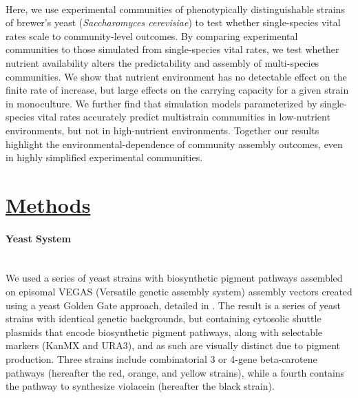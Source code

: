 \paragraph*{}
Here, we use experimental communities of phenotypically distinguishable strains of brewer's yeast (\textit{Saccharomyces cerevisiae}) to test whether single-species vital rates scale to community-level outcomes. By comparing experimental communities to those simulated from single-species vital rates, we test whether nutrient availability alters the predictability and assembly of multi-species communities. We show that nutrient environment has no detectable effect on the finite rate of increase, but large effects on the carrying capacity for a given strain in monoculture. We further find that simulation models parameterized by single-species vital rates accurately predict multistrain communities in low-nutrient environments, but not in high-nutrient environments. Together our results highlight the environmental-dependence of community assembly outcomes, even in highly simplified experimental communities.


\section*{\textbf{\underline{Methods}}}
\paragraph*{Yeast System}\mbox{}\\
We used a series of yeast strains with biosynthetic pigment pathways assembled on episomal VEGAS (Versatile genetic assembly system) assembly vectors created using a yeast Golden Gate approach, detailed in  \textcite{mitchell2015versatile}. The result is a series of yeast strains with identical genetic backgrounds, but containing cytosolic shuttle plasmids that encode biosynthetic pigment pathways, along with selectable markers (KanMX and URA3), and as such are visually distinct due to pigment production. Three strains include combinatorial 3 or 4-gene beta-carotene pathways (hereafter the red, orange, and yellow strains), while a fourth contains the pathway to synthesize violacein (hereafter the black strain). 

